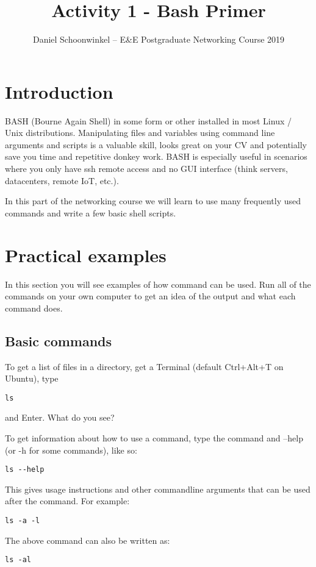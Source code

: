 \documentclass[a4paper]{article}
\title{Activity 1 - Bash Primer}
\author{Daniel Schoonwinkel -- E\&E Postgraduate Networking Course 2019}
\begin{document}
\maketitle

\section{Introduction}



BASH (Bourne Again Shell) in some form or other installed in most Linux / Unix distributions. Manipulating files and variables using command line arguments and scripts is a valuable skill, looks great on your CV and potentially save you time and repetitive donkey work. BASH is especially useful in scenarios where you only have ssh remote access and no GUI interface (think servers, datacenters, remote IoT, etc.). 

In this part of the networking course we will learn to use many frequently used commands and write a few basic shell scripts.  

\section{Practical examples}
In this section you will see examples of how command can be used. Run all of the commands on your own computer to get an idea of the output and what each command does.

\subsection{Basic commands}

To get a list of files in a directory, get a Terminal (default Ctrl+Alt+T on Ubuntu), type

\begin{lstlisting}
ls
\end{lstlisting}
and Enter. What do you see?

To get information about how to use a command, type the command and --help (or -h for some commands), like so: 

\begin{lstlisting}
ls --help
\end{lstlisting}
This gives usage instructions and other commandline arguments that can be used after the command. For example: 

\begin{lstlisting}
ls -a -l
\end{lstlisting}
The above command can also be written as:
\begin{lstlisting}
ls -al
\end{lstlisting}
\end{document}
